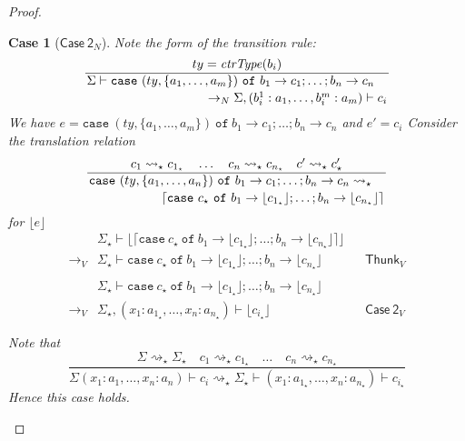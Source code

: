 \documentclass[float=false, crop=false]{standalone}
\newtheorem{case}{Case}
\numberwithin{subcase}{case}
\newcommand{\tlang}{\star}
\newcommand{\thunk}[1]{\lceil #1 \rceil}
\newcommand{\unwrap}[1]{\lfloor #1 \rfloor}
\newcommand{\tcbn}{\rightarrow_N}
\newcommand{\tcbv}{\rightarrow_V}
\newcommand{\tlthunk}{\rightsquigarrow_\tlang}
\begin{document}
\begin{proof}
\begin{case}[$\mathsf{Case\ 2}_N$]
  Note the form of the transition rule:
  \[ \dfrac{ty = \mathit{ctrType}(b_i)}{\splitdfrac{\Sigma \vdash 
  \mathtt{case}\ (ty,\{a_1,\dotsc,a_m\}) \ \mathtt{of}\ b_1 \rightarrow c_1; \dots; b_n \rightarrow c_n}
  {\tcbn \Sigma,(b_i^1:a_1,\dotsc,b_i^m:a_m) \vdash c_i}} \]
  We have $e = 
  \mathtt{case}\ (ty,\{a_1,\dotsc,a_m\}) \ \mathtt{of}\ b_1 \rightarrow c_1;
  \dots; b_n \rightarrow c_n$ and
  $e' = c_i$
  Consider the translation relation
  \[ \dfrac{c_1  \tlthunk c_{1_\tlang} \quad \dots \quad c_n \tlthunk c_{n_\tlang} 
      \quad c' \tlthunk c'_\tlang}
  {\splitdfrac{\mathtt{case}\ (ty,\{a_1,\dotsc,a_n\})\ \mathtt{of}\ 
      b_1 \rightarrow c_1; \dots; b_n \rightarrow c_n \tlthunk}
  {\thunk{\mathtt{case}\ c_\tlang\ \mathtt{of}\ b_1 \rightarrow \unwrap{c_{1_\tlang}}; 
      \dots; b_n \rightarrow \unwrap{c_{n_\tlang}}}}} \]
  for $\unwrap{e}$
  \begin{align*} 
  &\Sigma_\tlang \vdash \unwrap{\thunk{\mathtt{case}\ c_\tlang\ 
      \mathtt{of}\ b_1 \rightarrow \unwrap{c_{1_\tlang}}; 
      \dots; b_n \rightarrow \unwrap{c_{n_\tlang}}}}\\ \tcbv 
  &\Sigma_\tlang \vdash
  \mathtt{case}\ c_\tlang\ \mathtt{of}\ b_1 \rightarrow \unwrap{c_{1_\tlang}};  
      \dots; b_n \rightarrow \unwrap{c_{n_\tlang}} && \mathsf{Thunk}_V\\ \\
 & \Sigma_\tlang \vdash  \mathtt{case}\ c_\tlang\ \mathtt{of}\ b_1 \rightarrow \unwrap{c_{1_\tlang}};  
      \dots; b_n \rightarrow \unwrap{c_{n_\tlang}}\\ \tcbv
      &\Sigma_\tlang,(x_1:a_{1_\tlang},\dotsc,x_n:a_{n_\tlang}) \vdash \unwrap{c_{i_\tlang}}
      &&\mathsf{Case\ 2}_V\\ \\
\end{align*}
  Note that \[ \frac{\Sigma \tlthunk \Sigma_\tlang \quad c_1 \tlthunk c_{1_\tlang} \quad \dots \quad
    c_n \tlthunk c_{n_\tlang}}{\Sigma (x_1:a_1,\dotsc,x_n:a_n) \vdash c_i \tlthunk \Sigma_\tlang \vdash 
    (x_1:a_{1_\tlang},\dotsc,x_n:a_{n_\tlang}) \vdash c_{i_\tlang}} \]
Hence this case holds.
\end{case}

\end{proof}
\end{document}
